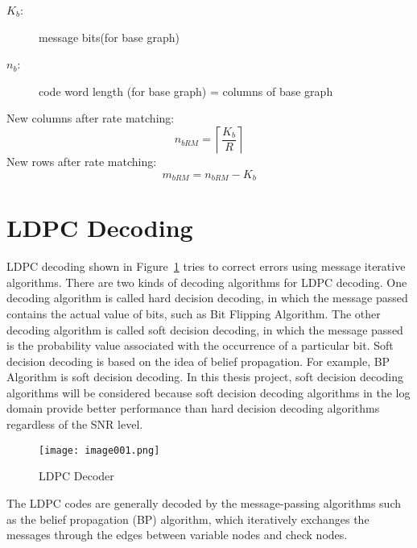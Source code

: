 \begin{description}
    \item[$K_b$:] message bits(for base graph)
    \item[$n_b$:] code word length (for base graph) = columns of base graph
\end{description}
 
New columns after rate matching:
\begin{equation}
    \label{eq:New columns after rate matching}
    n_{bRM}=\left\lceil\frac{K_b}{R}\right\rceil
\end{equation}
New rows after rate matching:
\begin{equation}
    \label{eq:New rowa after rate matching}
    m_{bRM}=n_{bRM}-K_b
\end{equation}

\section{LDPC Decoding}
\label{sec:LDPC decoding}
LDPC decoding shown in Figure~\ref{fig:LDPC decoder} tries to correct errors using message iterative algorithms. There are two kinds of decoding algorithms for LDPC decoding. One decoding algorithm is called hard decision decoding, in which the message passed contains the actual value of bits, such as Bit Flipping Algorithm. The other decoding algorithm is called soft decision decoding, in which the message passed is the probability value associated with the occurrence of a particular bit. Soft decision decoding is based on the idea of belief propagation. For example, BP Algorithm is soft decision decoding. In this thesis project, soft decision decoding algorithms will be considered because soft decision decoding algorithms in the log domain provide better performance than hard decision decoding algorithms regardless of the SNR level.
\begin{figure}[ht]
    \centering
    \texttt{[image: image001.png]}
    \caption{LDPC Decoder}
    \label{fig:LDPC decoder}
\end{figure}
The LDPC codes are generally decoded by the message-passing algorithms such as the belief propagation (BP) algorithm, which iteratively exchanges the messages through the edges between variable nodes and check nodes. \\
